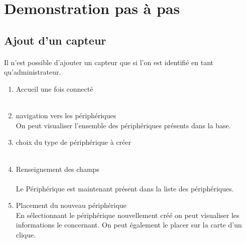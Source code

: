 \section{Demonstration pas à pas}
\subsection{Ajout d'un capteur}
\paragraph{} Il n'est possible d'ajouter un capteur que si l'on est identifié en tant qu'administrateur.

\begin{enumerate}
\item Accueil une fois connecté\\
~~\\
\item navigation vers les périphériques\\
On peut visualiser l'ensemble des périphériques présents dans la base.
~~\\
\item choix du type de périphérique à créer\\
~~\\
\item Renseignement des champs \\
~~\\
Le Périphérique est maintenant présent dans la liste des périphériques.
\item Placement du nouveau périphérique\\
En sélectionnant le périphérique nouvellement créé on peut visualiser les informations le concernant. On peut également le placer sur la carte d'un clique.\\
\end{enumerate}
